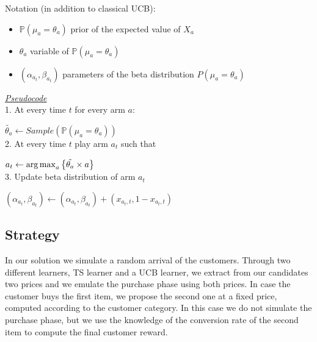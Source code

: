 Notation (in addition to classical UCB):\\
\begin{itemize}
	\item $\mathbb P(\mu_{a}=\theta_{a})$ prior of the expected value of $X_{a}$
	\item $\theta_{a}$ variable of $\mathbb P(\mu_{a}=\theta_{a})$
	\item $(\alpha_{a_{t}}, \beta_{a_{t}})$ parameters of the beta distribution $P(\mu_{a}=\theta_{a})$
\end{itemize}

\underline{\textit{Pseudocode}}\\

1. At every time $t$ for every arm $a$:

\hspace{2em}$\tilde{\theta_{a}} \leftarrow Sample(\mathbb P(\mu_{a}=\theta_{a}))$ \\

2. At every time $t$ play arm $a_{t}$ such that 

\hspace{2em}$a_{t} \leftarrow \operatorname{arg\,max}_a \left\{ \tilde{\theta_{a}} \times a \right\} $ \\

3.  Update beta distribution of arm $a_{t}$

\hspace{2em}$(\alpha_{a_{t}}, \beta_{a_{t}}) \leftarrow (\alpha_{a_{t}}, \beta_{a_{t}}) + (x_{a_{t},t}, 1 - x_{a_{t},t})$


\subsection*{Strategy}

In our solution we simulate a random arrival of the customers. Through two different learners, TS learner and a UCB learner, we extract from our candidates two prices and we emulate the purchase phase using both prices. In case the customer buys the first item, we propose the second one at a fixed price, computed according to the customer category. In this case we do not simulate the purchase phase, but we use the knowledge of the conversion rate of the second item to compute the final customer reward. 

